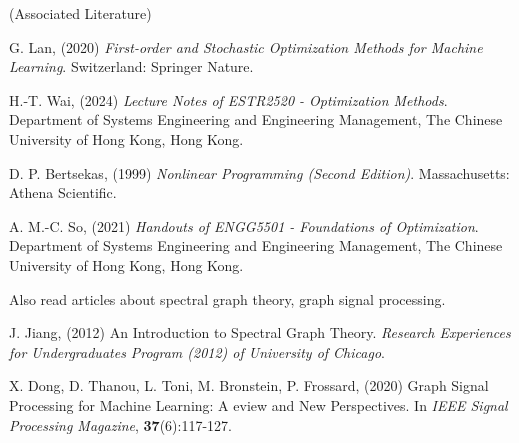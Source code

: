 \documentclass[10pt,a4paper]{article}
\begin{document}
\noindent(Associated Literature)
\begin{enumerate}[label=\text{[}B\arabic*\text{]}]
     \item \label{B1}G. Lan, (2020) \textit{First-order and Stochastic Optimization Methods for Machine Learning}. Switzerland: Springer Nature.
     \item \label{B2}H.-T. Wai, (2024) \textit{Lecture Notes of ESTR2520 - Optimization Methods}. Department of Systems Engineering and Engineering Management, The Chinese University of Hong Kong, Hong Kong.
     \item \label{B3}D. P. Bertsekas, (1999) \textit{Nonlinear Programming (Second Edition)}. Massachusetts: Athena Scientific.
     \item \label{B4}A. M.-C. So, (2021) \textit{Handouts of ENGG5501 - Foundations of Optimization}. Department of Systems Engineering and Engineering Management, The Chinese University of Hong Kong, Hong Kong.
\end{enumerate}

\noindent Also read articles about spectral graph theory, graph signal processing.

\begin{enumerate}[label=\text{[}C\arabic*\text{]}]
     \item \label{C1}J. Jiang, (2012) An Introduction to Spectral Graph Theory. \textit{Research Experiences for Undergraduates Program (2012) of University of Chicago}.
     \item \label{C2}X. Dong, D. Thanou, L. Toni, M. Bronstein, P. Frossard, (2020) Graph Signal Processing for Machine Learning: A eview and New Perspectives. In \textit{IEEE Signal Processing Magazine}, \textbf{37}(6):117-127.
\end{enumerate}
\end{document}
